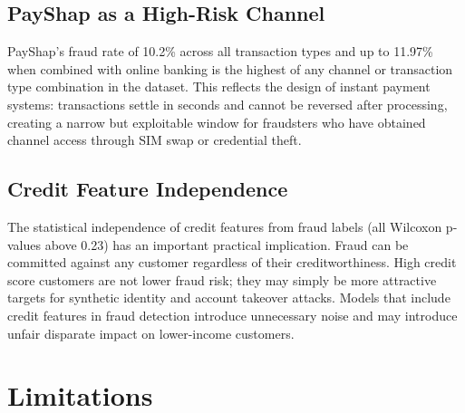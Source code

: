 \documentclass[12pt, a4paper]{article}
\begin{document}
\subsection{PayShap as a High-Risk Channel}

PayShap's fraud rate of 10.2\% across all transaction types and up to 11.97\% when combined with online banking is the highest of any channel or transaction type combination in the dataset. This reflects the design of instant payment systems: transactions settle in seconds and cannot be reversed after processing, creating a narrow but exploitable window for fraudsters who have obtained channel access through SIM swap or credential theft.

\subsection{Credit Feature Independence}

The statistical independence of credit features from fraud labels (all Wilcoxon p-values above 0.23) has an important practical implication. Fraud can be committed against any customer regardless of their creditworthiness. High credit score customers are not lower fraud risk; they may simply be more attractive targets for synthetic identity and account takeover attacks. Models that include credit features in fraud detection introduce unnecessary noise and may introduce unfair disparate impact on lower-income customers.

\section{Limitations}
\end{document}
